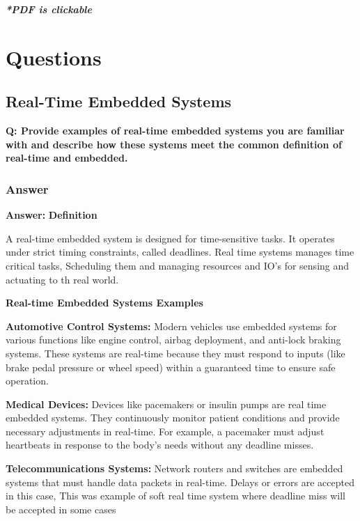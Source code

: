 \documentclass[a4paper,11pt]{article}%
\newenvironment{qanda}{\setlength{\parindent}{0pt}}{\bigskip}
\newcommand{\Q}{\bigskip\bfseries Q: }
\newcommand{\A}{\par\textbf{Answer: } \normalfont}
\begin{document}



\pagebreak

\tableofcontents
\listoffigures
\listoftables
\vfill
\begin{center}
	\textbf{\textit{*PDF is clickable}}
\end{center}

\pagebreak

\section{Questions}

\begin{qanda}
	
	\subsection{Real-Time Embedded Systems}
	\Q Provide examples of real-time embedded systems you are familiar with and describe how these
	systems meet the common definition of real-time and embedded.
	\subsubsection{Answer}
	\A \textbf{Definition}

	A real-time embedded system is designed for time-sensitive tasks. It operates under strict timing constraints, called deadlines. Real time systems manages time critical tasks, Scheduling them and managing resources and IO's for sensing and actuating to th real world.
	\linebreak
	

	\textbf{Real-time Embedded Systems Examples}

	\textbf{Automotive Control Systems:} Modern vehicles use embedded systems for various functions like engine control, airbag deployment, and anti-lock braking systems. These systems are real-time because they must respond to inputs (like brake pedal pressure or wheel speed) within a guaranteed time to ensure safe operation.

\textbf{Medical Devices:} Devices like pacemakers or insulin pumps are real time embedded systems. They continuously monitor patient conditions and provide necessary adjustments in real-time. For example, a pacemaker must adjust heartbeats in response to the body's needs without any deadline misses.


\textbf{Telecommunications Systems:} Network routers and switches are embedded systems that must handle data packets in real-time. Delays or errors are accepted in this case, This was example of soft real time system where deadline miss will be accepted in some cases


\end{qanda}
\end{document}
